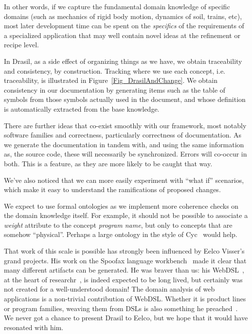 \documentclass[a4paper,UKenglish,cleveref,autoref,thm-restate]{oasics-v2021}
\begin{document}
In other words, if we capture the fundamental domain knowledge of specific
domains (such as mechanics of rigid body motion, dynamics of soil, trains,
etc), most later development time can be spent on the \emph{specifics} of the
requirements of a specialized application that may well contain novel ideas at
the refinement or recipe level.

In Drasil, as a side effect of organizing things as we have, we obtain
traceability and consistency, by construction.  Tracking where we use each
concept, i.e. traceability, is illustrated in Figure~\ref{Fig_DrasilAndChange}.
We obtain consistency in our documentation by generating items such as the
table of symbols from those symbols actually used in the document, and whose
definition is automatically extracted from the base knowledge.

There are further ideas that co-exist smoothly with our framework, most notably
software families and correctness, particularly correctness of documentation.  
As we generate the documentation in tandem with, and using the same information as,
the source code, these will necessarily be synchronized. Errors will co-occur in both.
This is a feature, as they are more likely to be caught that way.

We've also noticed that we can more easily experiment with ``what if'' scenarios,
which make it easy to understand the ramifications of proposed changes.  

We expect to use formal ontologies as we implement
more coherence checks on the domain knowledge itself. For example, it should not
be possible to associate a \textit{weight} attribute to the concept
\textit{program name}, but only to concepts that are somehow ``physical''. 
Perhaps a large ontology in the style of Cyc~\cite{lenat1995cyc} would help.

That work of this scale is possible has strongly been influenced by Eelco
Visser's grand projects. His work on the Spoofax language workbench~\cite{Spoofax}
made it clear that many different artifacts can be generated. He was braver than
us: his WebDSL~\cite{WebDSL}, at the heart of researchr~\cite{researchr}, is
indeed expected to be long lived, but certainly was not created for a
well-understood domain! The domain analysis of web applications is a non-trivial
contribution of WebDSL. Whether it is product lines or program families, weaving
them from DSLs is also something he preached~\cite{voelter2011product}.
We never got a chance to present Drasil to Eelco, but we hope that it would
have resonated with him.



\end{document}
